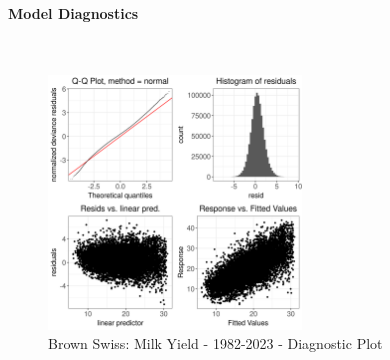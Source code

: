 \paragraph{Model Diagnostics} \quad \\
\begin{figure}[H]
    \centering
    \includegraphics[width=0.6\textwidth]{thesis/figures/models/milk/full/bs_milk_full/bs_milk_full_diagnostics.png}
    \caption[]{Brown Swiss: Milk Yield - 1982-2023 - Diagnostic Plot}
\end{figure}

\newpage
